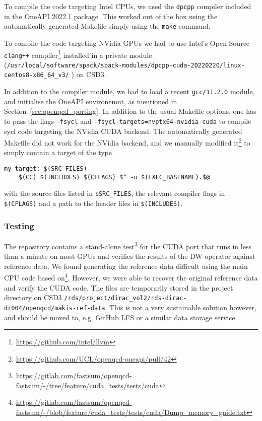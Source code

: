 \documentclass[../main]{subfiles}
\begin{document}
To compile the code targeting Intel CPUs, we used the \texttt{dpcpp} compiler included in the OneAPI 2022.1 package.
This worked out of the box using the automatically generated Makefile simply using the \texttt{make} command.

To compile the code targeting NVidia GPUs we had to use Intel's Open Source \verb #clang++# compiler\footnote{\url{https://github.com/intel/llvm}} installed in a private module (\verb #/usr/local/software/spack/spack-modules/dpcpp-cuda-20220220/linux-centos8-x86_64_v3/# ) on CSD3.

In addition to the compiler module, we had to load a recent \verb #gcc/11.2.0# module, and initialise the OneAPI environemnt, as mentioned in Section~\ref{sec:openqcd_porting}.
In addition to the usual Makefile options, one has to pass the flags \verb #-fsycl# and \verb #-fsycl-targets=nvptx64-nvidia-cuda# to compile sycl code targeting the NVidia CUDA backend.
The automatically generated Makefile did not work for the NVidia backend, and we manually modified it\footnote{\url{https://github.com/UCL/openqcd-oneapi/pull/42}} to simply contain a target of the type
\begin{verbatim}
my_target: $(SRC_FILES)
	$(CC) $(INCLUDES) $(CFLAGS) $^ -o $(EXEC_BASENAME).$@
\end{verbatim}
with the source files listed in \verb #$SRC_FILES#, the relevant compiler flags in \verb #$(CFLAGS)# and a path to the header files in \verb #$(INCLUDES)#.


\subsubsection{Testing}\label{testing_openqcd}

The repository contains a stand-alone test\footnote{\url{https://gitlab.com/fastsum/openqcd-fastsum/-/tree/feature/cuda_tests/tests/cuda}} for the CUDA port that runs in less than a minute on most GPUs and verifies the results of the DW operator against reference data.
We found generating the reference data difficult using the main CPU code based on\footnote{\url{https://gitlab.com/fastsum/openqcd-fastsum/-/blob/feature/cuda_tests/tests/cuda/Dump\_memory\_guide.txt}}.
However, we were able to recover the original reference data and verify the CUDA code.
The files are temporarily stored in the project directory on CSD3 \texttt{/rds/project/dirac\_vol2/rds-dirac-dr004/openqcd/makis-ref-data}.
This is not a very sustainable solution however, and should be moved to, e.g. GitHub LFS or a similar data storage service.
\end{document}
